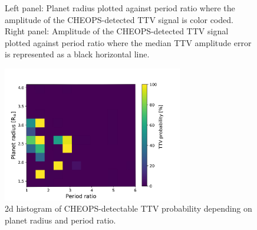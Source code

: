 \documentclass[12pt]{report}
\begin{document}
\begin{figure}
\begin{minipage}{.5\textwidth}
\end{minipage}
\caption{Left panel: Planet radius plotted against period ratio where the amplitude of the CHEOPS-detected TTV signal is color coded. Right panel: Amplitude of the CHEOPS-detected TTV signal plotted against period ratio where the median TTV amplitude error is represented as a black horizontal line.}
\label{fig:CHEOPS_perRatio}
\end{figure}

\begin{figure}
\centering
\includegraphics[width=0.7\textwidth]{img/2dhist3_new.pdf}
\caption{2d histogram of CHEOPS-detectable TTV probability depending on planet radius and period ratio.}
\label{fig:CHEOPS_prob}
\end{figure}

\end{document}
